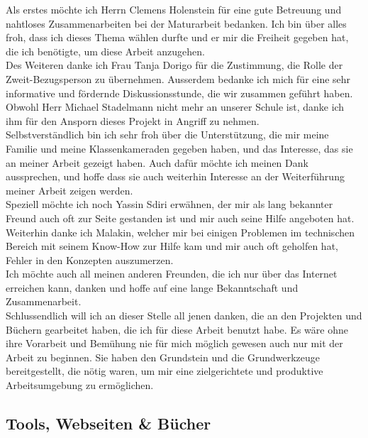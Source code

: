 \documentclass[12pt,a4paper,titlepage]{article}
\begin{document}
		Als erstes möchte ich Herrn Clemens Holenstein für eine gute Betreuung und nahtloses Zusammenarbeiten bei der Maturarbeit bedanken. Ich bin über alles froh, dass ich dieses Thema wählen durfte und er mir die Freiheit gegeben hat, die ich benötigte, um diese Arbeit anzugehen.\\
		
		Des Weiteren danke ich Frau Tanja Dorigo für die Zustimmung, die Rolle der Zweit-Bezugsperson zu übernehmen. Ausserdem bedanke ich mich für eine sehr informative und fördernde Diskussionsstunde, die wir zusammen geführt haben.\\
		
		Obwohl Herr Michael Stadelmann nicht mehr an unserer Schule ist, danke ich ihm für den Ansporn dieses Projekt in Angriff zu nehmen.\\
		
		Selbstverständlich bin ich sehr froh über die Unterstützung, die mir meine Familie und meine Klassenkameraden gegeben haben, und das Interesse, das sie an meiner Arbeit gezeigt haben. Auch dafür möchte ich meinen Dank aussprechen, und hoffe dass sie auch weiterhin Interesse an der Weiterführung meiner Arbeit zeigen werden.\\
		
		Speziell möchte ich noch Yassin Sdiri erwähnen, der mir als lang bekannter Freund auch oft zur Seite gestanden ist und mir auch seine Hilfe angeboten hat.\\
		
		Weiterhin danke ich Malakin, welcher mir bei einigen Problemen im technischen Bereich mit seinem Know-How zur Hilfe kam und mir auch oft geholfen hat, Fehler in den Konzepten auszumerzen.\\
		
		Ich möchte auch all meinen anderen Freunden, die ich nur über das Internet erreichen kann, danken und hoffe auf eine lange Bekanntschaft und Zusammenarbeit.\\
		
		Schlussendlich will ich an dieser Stelle all jenen danken, die an den Projekten und Büchern gearbeitet haben, die ich für diese Arbeit benutzt habe. Es wäre ohne ihre Vorarbeit und Bemühung nie für mich möglich gewesen auch nur mit der Arbeit zu beginnen. Sie haben den Grundstein und die Grundwerkzeuge bereitgestellt, die nötig waren, um mir eine zielgerichtete und produktive Arbeitsumgebung zu ermöglichen.\\
	
	\clearpage
	\subsection{Tools, Webseiten \& Bücher}
\end{document}
